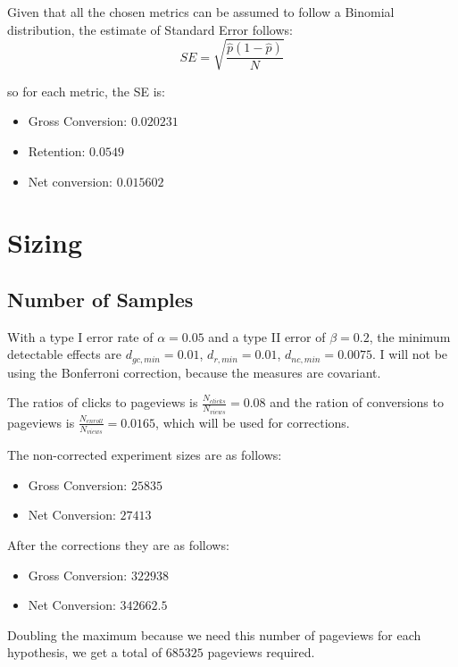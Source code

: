 \documentclass[12pt,a4paper]{article}
\begin{document}
Given that all the chosen metrics can be assumed to follow a Binomial
distribution, the estimate of Standard Error follows:
\begin{equation}
SE = \sqrt{\frac{\hat{p}(1-\hat{p})}{N}}
\end{equation}

so for each metric, the SE is:
\begin{itemize}
\item Gross Conversion: $0.020231$
\item Retention: $0.0549$
\item Net conversion: $0.015602$
\end{itemize}

\section{Sizing}
\subsection{Number of Samples}
With a type I error rate of $\alpha=0.05$ and a type II error of $\beta = 0.2$,
the minimum detectable effects are $d_{gc,min} = 0.01$, $d_{r,min} = 0.01$,
$d_{nc,min} = 0.0075$.
I will not be using the Bonferroni correction, because the measures are
covariant.

The ratios of clicks to pageviews is $\frac{N_{clicks}}{N_{views}} = 0.08$ and the
ration of conversions to pageviews is $\frac{N_{enroll}}{N_{views}} = 0.0165$,
which will be used for corrections.

The non-corrected experiment sizes are as follows:
\begin{itemize}
\item Gross Conversion: $25835$
\item Net Conversion: $27413$
\end{itemize}

After the corrections they are as follows:
\begin{itemize}
\item Gross Conversion: $322938$
\item Net Conversion: $342662.5$
\end{itemize}

Doubling the maximum because we need this number of pageviews for each
hypothesis, we get a total of $685325$ pageviews required.
\end{document}
